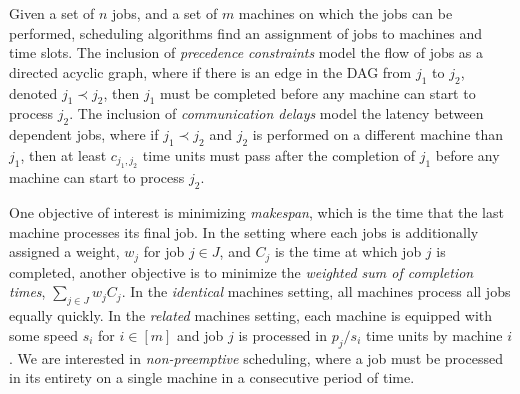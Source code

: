 


Given a set of $n$ jobs, and a set of $m$ machines on which the jobs can be performed, 
scheduling algorithms find an assignment of jobs to machines and time slots.
The inclusion of \emph{precedence constraints} model the flow of jobs as a directed acyclic graph, where 
 if there is an edge in the DAG from $j_1$ to $j_2$, denoted $j_1 \prec j_2$, then $j_1$ must be completed before any machine can start to process $j_2$.
The inclusion of  \emph{communication delays} model the latency between dependent jobs, 
where if $j_1 \prec j_2$ and $j_2$ is performed on a different machine than $j_1$, then at least $c_{j_1,j_2}$ time 
units must pass after the completion of $j_1$ before any machine can start to process $j_2$.

One objective of interest is minimizing \emph{makespan}, which is the time that the last machine processes its final job.
In the setting where each jobs is additionally assigned a weight, $w_j$ for job $j \in J$, and $C_j$ is the time at which job $j$ is completed,
another objective is to minimize the \emph{weighted sum of completion times}, $\sum_{j \in J} w_j C_j$.
In the \emph{identical} machines setting, all machines process all jobs equally quickly.
In the \emph{related} machines setting, each machine is equipped with some speed 
$s_i$ for $i \in [m]$ and job $j$ is processed in $p_j/s_i$ time units by machine $i$.
We are interested in \emph{non-preemptive} scheduling, where a job must be processed in its entirety on a single machine in a consecutive period of time.



